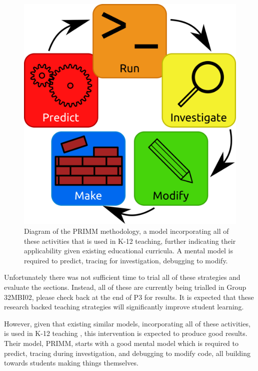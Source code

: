 \documentclass[paper=a4,]{tufte-handout}
\begin{document}
\begin{figure}[ht]
\centering
\includegraphics{./primm.png}
\caption{Diagram of the PRIMM methodology\cite{Sentance_2017}, a model incorporating all of these activities that is used in K-12 teaching, further indicating their applicability given existing educational curricula. A mental model is required to predict, tracing for investigation, debugging to modify.}
\end{figure}

Unfortunately there was not sufficient time to trial all of these
strategies and evaluate the sections. Instead, all of these are
currently being trialled in Group 32MBI02, please check back at the end
of P3 for results. It is expected that these research backed teaching
strategies will significantly improve student learning.

However, given that existing similar models, incorporating all of these
activities, is used in K-12 teaching \citep{Sentance_2017}, this
intervention is expected to produce good results. Their model, PRIMM,
starts with a good mental model which is required to predict, tracing
during investigation, and debugging to modify code, all building towards
students making things themselves.

\clearpage

\end{document}
